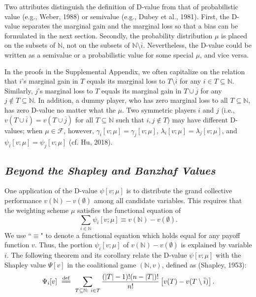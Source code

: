 \documentclass[a4paper,12pt]{article}
\newcommand{\eqdef}{\overset{\mathrm{def}}{=\joinrel=}}
\begin{document}
Two attributes distinguish the definition of D-value from that of probabilistic value (e.g., Weber, 1988) or semivalue (e.g., Dubey et al., 1981). 
First, the D-value separates the marginal gain and the marginal loss so that a bias can be formulated in the next section.
Secondly, the probability distribution $\mu$ is placed on the subsets of $\mathbb{N}$, not on the subsets of $\mathbb{N}\setminus \overline{i}$.
Nevertheless, the D-value could be written as a semivalue or a probabilistic value for some special $\mu$, and vice versa.

In the proofs in the Supplemental Appendix, we often capitalize on the relation that $i$'s marginal gain in $T$ equals its marginal loss to $T\setminus \overline{i}$ for any $i\in T \subseteq \mathbb{N}$.
Similarly, $j$'s marginal loss to $T$ equals its marginal gain in $T\cup \overline{j}$ for any $j\not \in T \subseteq \mathbb{N}$. In addition,
a dummy player, who has zero marginal loss to all $T\subseteq \mathbb{N}$,  has zero D-value no matter what the $\mu$. 
Two symmetric players $i$ and $j$ (i.e., $v(T\cup \overline{i}) = v(T\cup \overline{j})$ for all $T\subseteq \mathbb{N}$ such that $i, j\not \in T$) may  have different D-values;
when $\mu \in \mathscr{F}$, however, $\gamma_i[v;\mu]=\gamma_j[v;\mu]$, $\lambda_i[v;\mu]=\lambda_j[v;\mu]$, and $\psi_i[v;\mu]=\psi_j[v;\mu]$ (cf. Hu, 2018).



\subsection{\textit{Beyond the Shapley and Banzhaf Values}}\label{subsect:beyongSVBV}
\noindent One application of the D-value $\psi[v;\mu]$ is to distribute the grand collective performance $v(\mathbb{N})-v(\emptyset)$ 
among all candidate variables. This requires that the weighting scheme $\mu$ satisfies the functional equation of
\begin{equation}\label{eq:totality}
\sum\limits_{i\in \mathbb{N}} \psi_i [v;\mu] \equiv v(\mathbb{N})-v(\emptyset).
\end{equation}
We use ``$\equiv$" to denote a functional equation which holds equal for any payoff function $v$.
Thus, the portion $\psi_i [v;\mu]$ of $v(\mathbb{N})-v(\emptyset)$ is explained by variable $i$.
The following theorem and its corollary relate the D-value $\psi [v;\mu]$ with 
the Shapley value $\Psi[v]$ in the coalitional game $(\mathbb{N}, v)$, defined as (Shapley, 1953):
\begin{equation}\label{eq:shapley_value}
\Psi_i[v]\ \eqdef \ \sum\limits_{T\subseteq \mathbb{N}: \ i \in  T} \frac{(|T|-1)!(n-|T|)!}{n!} \left [v(T) - v(T\setminus \overline{i}) \right ].
\end{equation}
\end{document}
